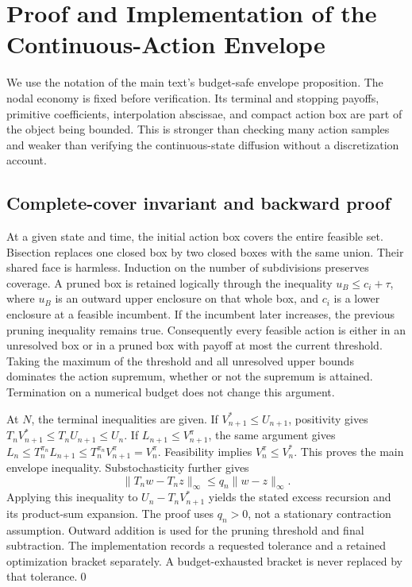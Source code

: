 \section{Proof and Implementation of the Continuous-Action Envelope}\label{supp:r8-envelope}
We use the notation of the main text's budget-safe envelope proposition. The nodal economy is fixed before verification. Its terminal and stopping payoffs, primitive coefficients, interpolation abscissae, and compact action box are part of the object being bounded. This is stronger than checking many action samples and weaker than verifying the continuous-state diffusion without a discretization account.

\subsection{Complete-cover invariant and backward proof}
At a given state and time, the initial action box covers the entire feasible set. Bisection replaces one closed box by two closed boxes with the same union. Their shared face is harmless. Induction on the number of subdivisions preserves coverage. A pruned box is retained logically through the inequality $u_B\leq c_i+\tau$, where $u_B$ is an outward upper enclosure on that whole box, and $c_i$ is a lower enclosure at a feasible incumbent. If the incumbent later increases, the previous pruning inequality remains true. Consequently every feasible action is either in an unresolved box or in a pruned box with payoff at most the current threshold. Taking the maximum of the threshold and all unresolved upper bounds dominates the action supremum, whether or not the supremum is attained. Termination on a numerical budget does not change this argument.

At $N$, the terminal inequalities are given. If $V_{n+1}^*\leq U_{n+1}$, positivity gives $T_nV_{n+1}^*\leq T_nU_{n+1}\leq U_n$. If $L_{n+1}\leq V_{n+1}^{\pi}$, the same argument gives $L_n\leq T_n^{\pi_n}L_{n+1}\leq T_n^{\pi_n}V_{n+1}^{\pi}=V_n^{\pi}$. Feasibility implies $V_n^{\pi}\leq V_n^*$. This proves the main envelope inequality. Substochasticity further gives
\[
 \|T_nw-T_nz\|_\infty\leq q_n\|w-z\|_\infty.
\]
Applying this inequality to $U_n-T_nV_{n+1}^*$ yields the stated excess recursion and its product-sum expansion. The proof uses $q_n>0$, not a stationary contraction assumption. Outward addition is used for the pruning threshold and final subtraction. The implementation records a requested tolerance and a retained optimization bracket separately. A budget-exhausted bracket is never replaced by that tolerance.\qed


